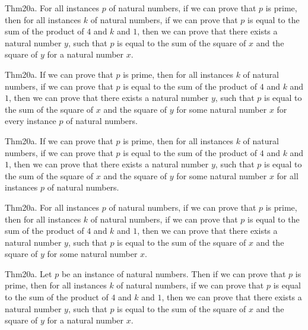 \documentclass{article}
\begin{document}
Thm20a. For all instances $p$ of natural numbers, if we can prove that $p$ is prime, then for all instances $k$ of natural numbers, if we can prove that $p$ is equal to the sum of the product of $4$ and $k$ and $1$, then we can prove that there exists a natural number $y$, such that $p$ is equal to the sum of the square of $x$ and the square of $y$ for a natural number $x$.

Thm20a. If we can prove that $p$ is prime, then for all instances $k$ of natural numbers, if we can prove that $p$ is equal to the sum of the product of $4$ and $k$ and $1$, then we can prove that there exists a natural number $y$, such that $p$ is equal to the sum of the square of $x$ and the square of $y$ for some natural number $x$ for every instance $p$ of natural numbers.

Thm20a. If we can prove that $p$ is prime, then for all instances $k$ of natural numbers, if we can prove that $p$ is equal to the sum of the product of $4$ and $k$ and $1$, then we can prove that there exists a natural number $y$, such that $p$ is equal to the sum of the square of $x$ and the square of $y$ for some natural number $x$ for all instances $p$ of natural numbers.

Thm20a. For all instances $p$ of natural numbers, if we can prove that $p$ is prime, then for all instances $k$ of natural numbers, if we can prove that $p$ is equal to the sum of the product of $4$ and $k$ and $1$, then we can prove that there exists a natural number $y$, such that $p$ is equal to the sum of the square of $x$ and the square of $y$ for some natural number $x$.

Thm20a. Let $p$ be an instance of natural numbers. Then if we can prove that $p$ is prime, then for all instances $k$ of natural numbers, if we can prove that $p$ is equal to the sum of the product of $4$ and $k$ and $1$, then we can prove that there exists a natural number $y$, such that $p$ is equal to the sum of the square of $x$ and the square of $y$ for a natural number $x$.
\end{document}
